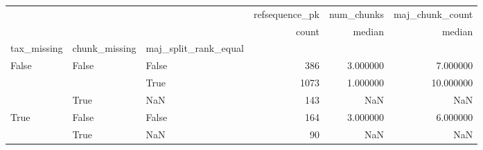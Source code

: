 \begin{tabular}{lllrrr}
\toprule
 &  &  & refsequence\_pk & num\_chunks & maj\_chunk\_count \\
 &  &  & count & median & median \\
tax_missing & chunk_missing & maj_split_rank_equal &  &  &  \\
\midrule
\multirow[t]{3}{*}{False} & \multirow[t]{2}{*}{False} & False & 386 & 3.000000 & 7.000000 \\
 &  & True & 1073 & 1.000000 & 10.000000 \\
\cline{2-6}
 & True & NaN & 143 & NaN & NaN \\
\cline{1-6} \cline{2-6}
\multirow[t]{2}{*}{True} & False & False & 164 & 3.000000 & 6.000000 \\
\cline{2-6}
 & True & NaN & 90 & NaN & NaN \\
\cline{1-6} \cline{2-6}
\bottomrule
\end{tabular}
